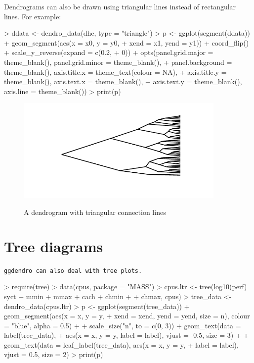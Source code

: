 \documentclass[a4paper]{article}
\newcommand{\ggdendro}{\tt ggdendro}
\begin{document}
Dendrograms can also be drawn using triangular lines instead of rectangular lines.  For example:

\begin{Schunk}
\begin{Sinput}
> ddata <- dendro_data(dhc, type = "triangle")
> p <- ggplot(segment(ddata)) + geom_segment(aes(x = x0, y = y0, 
+     xend = x1, yend = y1)) + coord_flip() + scale_y_reverse(expand = c(0.2, 
+     0)) + opts(panel.grid.major = theme_blank(), panel.grid.minor = theme_blank(), 
+     panel.background = theme_blank(), axis.title.x = theme_text(colour = NA), 
+     axis.title.y = theme_blank(), axis.text.x = theme_blank(), 
+     axis.text.y = theme_blank(), axis.line = theme_blank())
> print(p)
\end{Sinput}
\end{Schunk}

\begin{figure}[h]
\begin{center}
{
\includegraphics[width=4in, height=2in]{ggdendro-dendro3}
}
\end{center}
\caption{A dendrogram with triangular connection lines}
\end{figure}

  

\section{Tree diagrams}

\ggdendro{} can also deal with tree plots.

\begin{Schunk}
\begin{Sinput}
> require(tree)
> data(cpus, package = "MASS")
> cpus.ltr <- tree(log10(perf) ~ syct + mmin + mmax + cach + chmin + 
+     chmax, cpus)
> tree_data <- dendro_data(cpus.ltr)
> p <- ggplot(segment(tree_data)) + geom_segment(aes(x = x, y = y, 
+     xend = xend, yend = yend, size = n), colour = "blue", alpha = 0.5) + 
+     scale_size("n", to = c(0, 3)) + geom_text(data = label(tree_data), 
+     aes(x = x, y = y, label = label), vjust = -0.5, size = 3) + 
+     geom_text(data = leaf_label(tree_data), aes(x = x, y = y, 
+         label = label), vjust = 0.5, size = 2)
> print(p)
\end{Sinput}
\end{Schunk}
\end{document}
